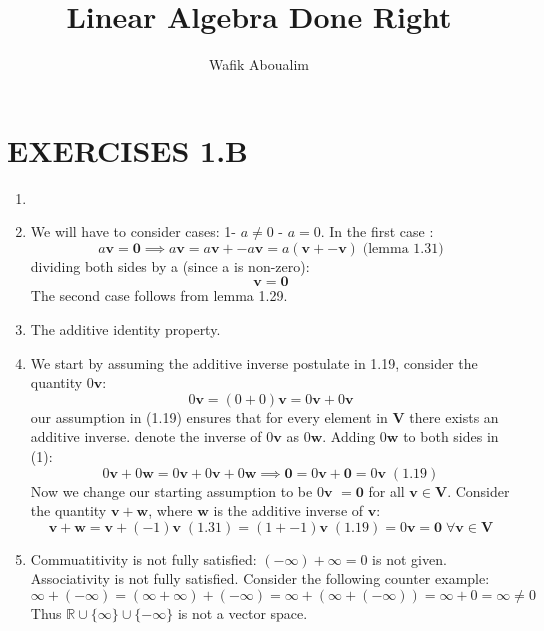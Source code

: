 \documentclass{article}
\title{Linear Algebra Done Right}
\author{Wafik Aboualim}
\begin{document}
\maketitle
\section*{EXERCISES 1.B}
\begin{enumerate}
\item 
\item We will have to consider cases: 1- $a \neq 0$ - $a = 0$. In the first case :
\begin{equation*}
a \bm{v} = \bm{0} \implies a \bm{v} = a\bm{v} + -a\bm{v} = a(\bm{v} + \bm{-v}) \; \text{(lemma 1.31)}
\end{equation*}
dividing both sides by a (since a is non-zero):
\begin{equation*}
\bm{v} = \bm{0}
\end{equation*}
The second case follows from lemma 1.29.

\item The additive identity property.
\item We start by assuming the additive inverse postulate in 1.19, consider the quantity $0\bm{v}$:
\begin{equation}
0\bm{v} = (0 + 0)\bm{v} = 0\bm{v} + 0\bm{v}
\end{equation}  
our assumption in (1.19) ensures that for every element in $\bm{V}$ there exists an additive inverse. denote the inverse of $0\bm{v}$ as $0\bm{w}$. Adding $0\bm{w}$ to both sides in (1):
\begin{equation}
0\bm{v} + 0\bm{w} =  0\bm{v} + 0\bm{v} + 0\bm{w} \implies \bm{0} = 0\bm{v} + \bm{0} = 0\bm{v}\; (1.19)
\end{equation}  
Now we change our starting assumption to be $0\bm{v}$ $= \bm{0}$ for all $\bm{v} \in \bm{V}$. Consider the quantity $\bm{v} + \bm{w}$, where $\bm{w}$ is the additive inverse of $\bm{v}$: 
\begin{equation*}
\bm{v} + \bm{w} = \bm{v} + (-1)\bm{v} \; (1.31) = (1+-1)\bm{v} \; (1.19) = 0\bm{v} = \bm{0} \;  \forall \bm{v} \in \bm{V} 
\end{equation*}

\item Commuatitivity is not fully satisfied: $(-\infty) + \infty = 0$ is not given. Associativity is not fully satisfied. Consider the following counter example:
\begin{equation*}
\infty + (-\infty) = (\infty + \infty) + (-\infty) = \infty + (\infty + (-\infty)) = \infty + 0 = \infty \neq 0
\end{equation*} 
Thus $\mathbb{R} \cup \{\infty\} \cup \{-\infty\}$ is not a vector space.
\end{enumerate}
\end{document}
